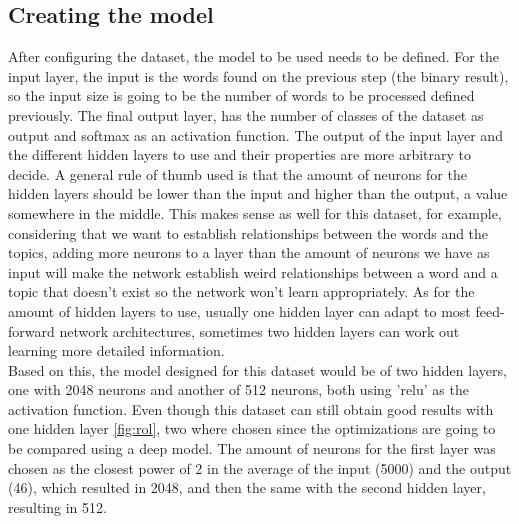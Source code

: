 \documentclass{article}
\begin{document}
\subsection{Creating the model}
After configuring the dataset, the model to be used needs to be defined. For the input layer, the input is the words found on the previous step (the binary result), so the input size is going to be the number of words to be processed defined previously. The final output layer, has the number of classes of the dataset as output and softmax as an activation function. The output of the input layer and the different hidden layers to use and their properties are more arbitrary to decide. A general rule of thumb used is that the amount of neurons for the hidden layers should be lower than the input and higher than the output, a value somewhere in the middle. This makes sense as well for this dataset, for example, considering that we want to establish relationships between the words and the topics, adding more neurons to a layer than the amount of neurons we have as input will make the network establish weird relationships between a word and a topic that doesn't exist so the network won't learn appropriately. As for the amount of hidden layers to use, usually one hidden layer can adapt to most feed-forward network architectures, sometimes two hidden layers can work out learning more detailed information.\\
Based on this, the model designed for this dataset would be of two hidden layers, one with 2048 neurons and another of 512 neurons, both using 'relu' as the activation function. Even though this dataset can still obtain good results with one hidden layer \ref{fig:rol}, two where chosen since the optimizations are going to be compared using a deep model. The amount of neurons for the first layer was chosen as the closest power of 2 in the average of the input (5000) and the output (46), which resulted in 2048, and then the same with the second hidden layer, resulting in 512.
\end{document}
